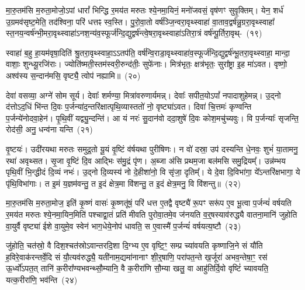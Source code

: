 {\anuvakamend[{अ॒स्मै॒ त ए॒व द्वाद॑श च}]}

मा॒रु॒तम॑सि म॒रुता॒मोजो॒\-ऽपां धारां᳚ भिन्द्धि र॒मय॑त मरुतः श्ये॒न\-मा॒यिनं॒ मनो॑जवसं॒ वृष॑णꣳ सुवृ॒क्तिम्। येन॒ शर्ध॑ उ॒ग्र\-मव॑\-सृष्ट॒मेति॒ तद॑श्विना॒ परि॑ धत्तꣴ स्व॒स्ति। पु॒रो॒\-वा॒तो वर्\mbox{}ष॑ञ्जि॒न्वरा॒\-वृथ्\-स्वाहा॑ वा॒ता\-व॒द्वर्\mbox{}ष॑न्नु॒ग्ररा॒वृथ्\-स्वाहा᳚ स्त॒न\-य॒न्वर्\mbox{}ष॑न्भी॒म\-रा॒\-वृथ्\-स्वाहा॑\-ऽन\-श॒न्य॑व॒\-स्फूर्ज॑न्दि॒द्युद्वर्\mbox{}ष॑न्त्वे॒ष\-रा॒\-वृथ्\-स्वाहा॑\-ऽतिरा॒त्रं वर्\mbox{}ष॑न्पू॒र्तिरा॒वृथ्-~(१९)\ip

स्वाहा॑ ब॒हु हा॒यम॑वृषा॒दिति॑ श्रु॒तरा॒वृथ्\-स्वाहा॒\-ऽऽ\-तप॑ति॒ वर्\mbox{}ष॑न्वि॒राडा॒वृथ्\-स्वाहा॑\-व॒स्फूर्ज॑न्दि॒द्युद्वर्\mbox{}ष॑न्भू॒तरा॒वृथ्\-स्वाहा॒ मान्दा॒ वाशाः॒ शुन्ध्यू॒रजि॑राः। ज्योति॑ष्मती॒स्तम॑स्वरी॒रुन्द॑तीः॒ सुफे॑नाः। मित्र॑भृतः॒ क्षत्र॑भृतः॒ सुरा᳚ष्ट्रा इ॒ह मा॑\-ऽवत। वृष्णो॒ अश्व॑स्य स॒न्दान॑मसि॒ वृष्ट्यै॒ त्वोप॑ नह्यामि॥~(२०)\ip

{\anuvakamend[{पू॒र्तिरा॒वृद्द्विच॑त्वारिꣳशच्च}]}

देवा॑ वसव्या॒ अग्ने॑ सोम सूर्य। देवाः᳚ शर्मण्या॒ मित्रा॑वरुणार्यमन्न्। देवाः᳚ सपीत॒यो\-ऽपां᳚ नपादाशुहेमन्न्। उ॒द्नो द॑त्तो\-ऽद॒धिं भि॑न्त दि॒वः प॒र्जन्या॑द॒न्तरि॑क्षात्पृथि॒व्यास्ततो॑ नो॒ वृष्ट्या॑\-ऽवत। दिवा॑ चि॒त्तमः॑ कृण्वन्ति प॒र्जन्ये॑नोदवा॒हेन॑। पृ॒थि॒वीं यद्व्यु॒न्दन्ति॑। आ यं नरः॑ सु॒दान॑वो ददा॒शुषे॑ दि॒वः कोश॒मचु॑च्यवुः। वि प॒र्जन्याः᳚ सृजन्ति॒ रोद॑सी॒ अनु॒ धन्व॑ना यन्ति~(२१)\ip

वृ॒ष्टयः॑। उदी॑रयथा मरुतः समुद्र॒तो यू॒यं वृ॒ष्टिं व॑र्\mbox{}षयथा पुरीषिणः। न वो॑ दस्रा॒ उप॑ दस्यन्ति धे॒नवः॒ शुभं॑ या॒तामनु॒ रथा॑ अवृथ्सत। सृ॒जा वृ॒ष्टिं दि॒व आद्भिः स॑मु॒द्रं पृ॑ण। अ॒ब्जा अ॑सि प्रथम॒जा बल॑मसि समु॒द्रियम्᳚। उन्न॑म्भय पृथि॒वीं भि॒न्द्धीदं दि॒व्यं नभः॑। उ॒द्नो दि॒व्यस्य॑ नो दे॒हीशा॑नो॒ वि सृ॑जा॒ दृतिम्᳚। ये दे॒वा दि॒विभा॑गा॒ ये᳚\-ऽन्तरि॑क्षभागा॒ ये पृ॑थि॒विभा॑गाः। त इ॒मं य॒ज्ञम॑वन्तु॒ त इ॒दं क्षेत्र॒मा वि॑शन्तु॒ त इ॒दं क्षेत्र॒मनु॒ वि वि॑शन्तु॥~(२२)\ip

{\anuvakamend[{य॒न्ति॒ दे॒वा विꣳ॑शति॒श्च॑}]}

मा॒रु॒तम॑सि म॒रुता॒मोज॒ इति॑ कृ॒ष्णं वासः॑ कृ॒ष्णतू॑षं॒ परि॑ धत्त ए॒तद्वै वृष्ट्यै॑ रू॒पꣳ सरू॑प ए॒व भू॒त्वा प॒र्जन्यं॑ वर्\mbox{}षयति र॒मय॑त मरुतः श्ये॒नमा॒यिन॒मिति॑ पश्चाद्वा॒तं प्रति॑ मीवति पुरोवा॒तमे॒व ज॑नयति व॒र्॒\mbox{}षस्याव॑रुद्ध्यै वातना॒मानि॑ जुहोति वा॒युर्वै वृष्ट्या॑ ईशे वा॒युमे॒व स्वेन॑ भाग॒धेये॒नोप॑ धावति॒ स ए॒वास्मै॑ प॒र्जन्यं॑ वर्\mbox{}षयत्य॒ष्टौ~(२३)\ip

जु॑होति॒ चत॑स्रो॒ वै दिश॒श्चत॑स्रो\-ऽवान्तरदि॒शा दि॒ग्भ्य ए॒व वृष्टि॒ꣳ॒ सम्प्र च्या॑वयति कृष्णाजि॒ने सं यौ॑ति ह॒विरे॒वाक॑रन्तर्वे॒दि सं यौ॒त्यव॑रुद्ध्यै॒ यती॑नाम॒द्यमा॑नानाꣳ शी॒र्॒\mbox{}षाणि॒ परा॑पत॒न्ते ख॒र्जूरा॑ अभव॒न्तेषा॒ꣳ॒ रस॑ ऊ॒र्ध्वो॑\-ऽपत॒त् तानि॑ क॒रीरा᳚ण्यभवन्थ्सौ॒म्यानि॒ वै क॒रीरा॑णि सौ॒म्या खलु॒ वा आहु॑तिर्दि॒वो वृष्टिं॑ च्यावयति॒ यत्क॒रीरा॑णि॒ भव॑न्ति~(२४)\ip

